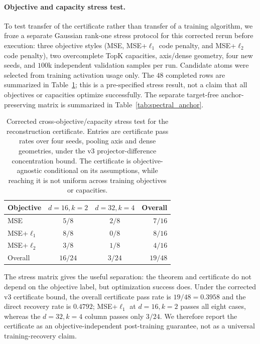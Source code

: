 \documentclass{article}
\theoremstyle{plain}
\begin{document}
{\paragraph{Objective and capacity stress test.} To test transfer of the certificate rather than transfer of a training algorithm, we froze a separate Gaussian rank-one stress protocol for this corrected rerun before execution: three objective styles (MSE, MSE+$\ell_1$ code penalty, and MSE+$\ell_2$ code penalty), two overcomplete TopK capacities, axis/dense geometry, four new seeds, and $100$k independent validation samples per run. Candidate atoms were selected from training activation usage only. The $48$ completed rows are summarized in Table~\ref{tab:certificate_stress}; this is a pre-specified stress result, not a claim that all objectives or capacities optimize successfully. The separate target-free anchor-preserving matrix is summarized in Table~\ref{tab:spectral_anchor}.

\begin{table}[H]
\caption{Corrected cross-objective/capacity stress test for the reconstruction certificate. Entries are certificate pass rates over four seeds, pooling axis and dense geometries, under the v3 projector-difference concentration bound. The certificate is objective-agnostic conditional on its assumptions, while reaching it is not uniform across training objectives or capacities.}
\label{tab:certificate_stress}
\begin{center}
\scriptsize
\begin{tabular}{@{}lccr@{}}
\toprule
Objective & $d{=}16,k{=}2$ & $d{=}32,k{=}4$ & Overall \\
\midrule
MSE & $5/8$ & $2/8$ & $7/16$ \\
MSE+$\ell_1$ & $8/8$ & $0/8$ & $8/16$ \\
MSE+$\ell_2$ & $3/8$ & $1/8$ & $4/16$ \\
\midrule
Overall & $16/24$ & $3/24$ & $19/48$ \\
\bottomrule
\end{tabular}
\end{center}
\end{table}

The stress matrix gives the useful separation: the theorem and certificate do not depend on the objective label, but optimization success does. Under the corrected v3 certificate bound, the overall certificate pass rate is $19/48=0.3958$ and the direct recovery rate is $0.4792$; MSE+$\ell_1$ at $d{=}16,k{=}2$ passes all eight cases, whereas the $d{=}32,k{=}4$ column passes only $3/24$. We therefore report the certificate as an objective-independent post-training guarantee, not as a universal training-recovery claim.

}
\end{document}
